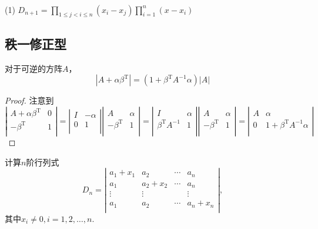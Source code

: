 \documentclass[lang=cn,newtx,10pt,scheme=chinese]{elegantbook}
\begin{document}
\begin{solution}
    \ \\
    (1) $D_{n+1} = \prod_{1 \le j < i \le n}(x_i - x_j) \prod_{i=1}^n(x - x_i)$
\end{solution}

\subsection{秩一修正型}

对于可逆的方阵$A$，
$$
\left|A + \alpha\beta^\mathrm{T}\right| = (1+\beta^\mathrm{T}A^{-1}\alpha)\left|A\right|
$$
\begin{proof}
    注意到
	$$
	\left|
    \begin{array}{cc}
        A + \alpha\beta^\mathrm{T}	& 0	\\
        -\beta^\mathrm{T}       	& 1	\\
    \end{array}
  	\right|
	=
	\left|
    \begin{array}{cc}
        I	& -\alpha	\\
        0	& 1			\\
    \end{array}
  	\right|
	\left|
    \begin{array}{cc}
        A					& \alpha	\\
        -\beta^\mathrm{T}	& 1			\\
    \end{array}
  	\right|
	=
	\left|
    \begin{array}{cc}
        I						& \alpha	\\
        \beta^\mathrm{T} A^{-1}	& 1			\\
    \end{array}
  	\right|
	\left|
    \begin{array}{cc}
        A					& \alpha	\\
        -\beta^\mathrm{T}	& 1			\\
    \end{array}
  	\right|
	=
	\left|
    \begin{array}{cc}
        A	& \alpha							\\
        0	& 1+\beta^\mathrm{T}A^{-1}\alpha	\\
    \end{array}
  	\right|
	$$
\end{proof}

\begin{exercise}
    计算$n$阶行列式
	$$
	D_n = 
    \left|
    \begin{array}{ccccc}
        a_1 + x_1	& a_2		& \cdots	& a_n		\\
        a_1   		& a_2 + x_2 & \cdots	& a_n		\\
        \vdots		& \vdots	& 			& \vdots	\\
        a_1   		& a_2		& \cdots	& a_n + x_n \\
    \end{array}
    \right|
    ,$$
    其中$x_i \neq 0,i = 1, 2, \dots, n.$
\end{exercise}
\end{document}
